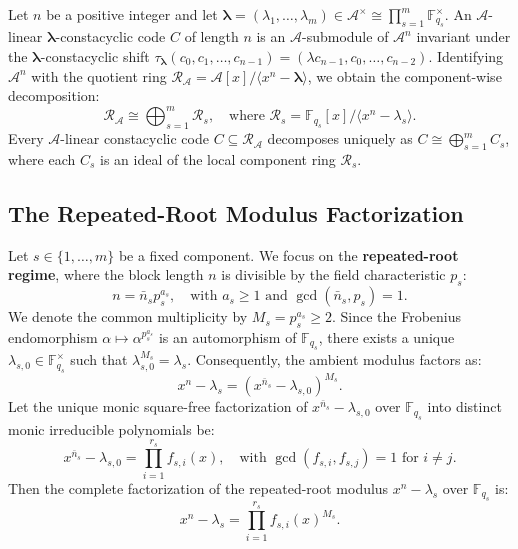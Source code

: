 \documentclass[preprint,12pt]{elsarticle}
\numberwithin{equation}{section}
\theoremstyle{plain}
\theoremstyle{definition}
\theoremstyle{remark}
\begin{document}
Let $n$ be a positive integer and let $\boldsymbol{\lambda} = (\lambda_1, \dots, \lambda_m) \in \mathcal{A}^\times \cong \prod_{s=1}^m \mathbb{F}_{q_s}^\times$. An $\mathcal{A}$-linear $\boldsymbol{\lambda}$-constacyclic code $C$ of length $n$ is an $\mathcal{A}$-submodule of $\mathcal{A}^n$ invariant under the $\boldsymbol{\lambda}$-constacyclic shift $\tau_{\boldsymbol{\lambda}}(c_0, c_1, \dots, c_{n-1}) = (\lambda c_{n-1}, c_0, \dots, c_{n-2})$. Identifying $\mathcal{A}^n$ with the quotient ring $\mathcal{R}_{\mathcal{A}} = \mathcal{A}[x]/\langle x^n - \boldsymbol{\lambda}\rangle$, we obtain the component-wise decomposition:
\begin{equation}
    \mathcal{R}_{\mathcal{A}} \cong \bigoplus_{s=1}^m \mathcal{R}_s, \quad \text{where } \mathcal{R}_s = \mathbb{F}_{q_s}[x]/\langle x^n - \lambda_s\rangle.
\end{equation}
Every $\mathcal{A}$-linear constacyclic code $C \subseteq \mathcal{R}_{\mathcal{A}}$ decomposes uniquely as $C \cong \bigoplus_{s=1}^m C_s$, where each $C_s$ is an ideal of the local component ring $\mathcal{R}_s$.

\subsection{The Repeated-Root Modulus Factorization}
Let $s \in \{1, \dots, m\}$ be a fixed component. We focus on the \textbf{repeated-root regime}, where the block length $n$ is divisible by the field characteristic $p_s$:
\begin{equation}
    n = \bar{n}_s p_s^{a_s}, \quad \text{with } a_s \ge 1 \text{ and } \gcd(\bar{n}_s, p_s) = 1.
\end{equation}
We denote the common multiplicity by $M_s = p_s^{a_s} \ge 2$. Since the Frobenius endomorphism $\alpha \mapsto \alpha^{p_s^{a_s}}$ is an automorphism of $\mathbb{F}_{q_s}$, there exists a unique $\lambda_{s, 0} \in \mathbb{F}_{q_s}^\times$ such that $\lambda_{s, 0}^{M_s} = \lambda_s$. Consequently, the ambient modulus factors as:
\begin{equation}
    x^n - \lambda_s = (x^{\bar{n}_s} - \lambda_{s, 0})^{M_s}.
\end{equation}
Let the unique monic square-free factorization of $x^{\bar{n}_s} - \lambda_{s, 0}$ over $\mathbb{F}_{q_s}$ into distinct monic irreducible polynomials be:
\begin{equation}
    x^{\bar{n}_s} - \lambda_{s, 0} = \prod_{i=1}^{r_s} f_{s, i}(x), \quad \text{with } \gcd(f_{s, i}, f_{s, j}) = 1 \text{ for } i \ne j.
\end{equation}
Then the complete factorization of the repeated-root modulus $x^n - \lambda_s$ over $\mathbb{F}_{q_s}$ is:
\begin{equation}\label{eq:repeated_root_factorization}
    x^n - \lambda_s = \prod_{i=1}^{r_s} f_{s, i}(x)^{M_s}.
\end{equation}
\end{document}
